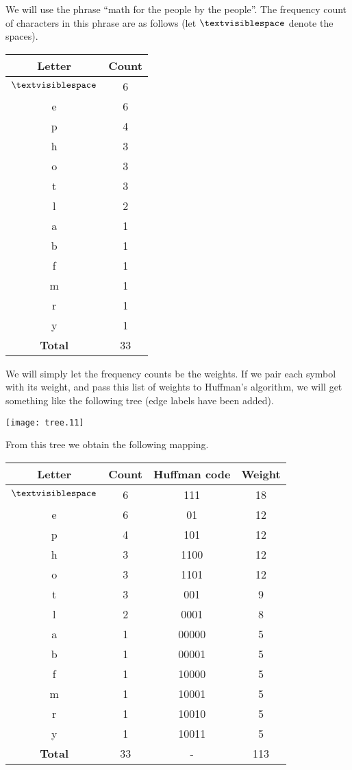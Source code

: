 \documentclass[12pt]{article}
\begin{document}
We will use the phrase ``math for the people by the people''.  The frequency count of characters in this phrase are as follows (let $\textvisiblespace$ denote the spaces).

\begin{center}
\begin{tabular}{|c|c|}
\hline
\textbf{Letter} & \textbf{Count} \\
\hline
\hline
$\textvisiblespace$ & 6 \\
\hline
e & 6 \\
\hline
p & 4 \\
\hline
h & 3 \\
\hline
o & 3 \\
\hline
t & 3 \\
\hline
l & 2 \\
\hline
a & 1 \\
\hline
b & 1 \\
\hline
f & 1 \\
\hline
m & 1 \\
\hline
r & 1 \\
\hline
y & 1 \\
\hline
\hline
\textbf{Total} & 33 \\
\end{tabular}
\end{center}

We will simply let the frequency counts be the weights.  If we pair each symbol with its weight, and pass this list of weights to Huffman's algorithm, we will get something like the following tree (edge labels have been added).

\begin{center}
\texttt{[image: tree.11]}
\end{center}

From this tree we obtain the following mapping.

\begin{center}
\begin{tabular}{|c|c|c|c|}
\hline
\textbf{Letter} & \textbf{Count} & \textbf{Huffman code} & \textbf{Weight} \\
\hline
\hline
$\textvisiblespace$ & 6 & 111 & 18\\
\hline
e & 6 & 01 & 12 \\
\hline
p & 4 & 101 & 12\\
\hline
h & 3 & 1100 & 12\\
\hline
o & 3 & 1101 & 12\\
\hline
t & 3 & 001 & 9 \\
\hline
l & 2 & 0001 & 8 \\
\hline
a & 1 & 00000 & 5\\
\hline
b & 1 & 00001 & 5\\
\hline
f & 1 & 10000 & 5\\
\hline
m & 1 & 10001 & 5\\
\hline
r & 1 & 10010 & 5\\
\hline
y & 1 & 10011 & 5\\
\hline
\hline
\textbf{Total} & 33 & - & 113 \\
\end{tabular}
\end{center}
\end{document}
